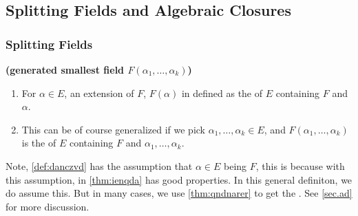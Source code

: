 \documentclass{article}
\newcommand{\bfs}[1]{\textbf{({#1}) }}
\begin{document}
\subsection{Splitting Fields and Algebraic Closures}

\subsubsection{Splitting Fields}\label{sec:poamdqed}
\begin{defa}\bfs{generated smallest field $F(\alpha_{1}, \ldots, \alpha_{k})$}
\begin{enumerate}
    \item For $\alpha \in E$,  an extension of $F$,  $F(\alpha)$ in defined as the  of $E$ containing $F$ and $\alpha$. 
    \item This can be of course generalized if we pick $\alpha_{1}, \ldots, \alpha_{k} \in E$, and $F\left(\alpha_{1}, \ldots, \alpha_{k}\right)$ is the  of $E$ containing $F$ and $\alpha_{1}, \ldots, \alpha_{k}$.
\end{enumerate}
\end{defa}
\begin{rema}
Note, \cref{def:danczvd} has the assumption that $\alpha\in E$ being  $F$, this is because with this assumption, in \cref{thm:ienqda} has good properties. In this general definiton, we do  assume this. But in many cases, we use \cref{thm:qndnarer} to get the  . See \cref{sec.ad} for more discussion. 
\end{rema}
\end{document}
